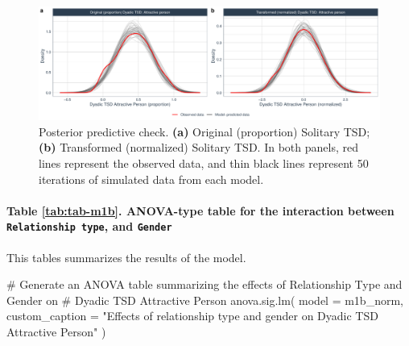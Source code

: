 \documentclass[
  bookmarksnumbered]{article}
\newenvironment{Shaded}{\begin{snugshade}}{\end{snugshade}}
\newcommand{\AttributeTok}[1]{\textcolor[rgb]{0.80,0.80,0.80}{#1}}
\newcommand{\CommentTok}[1]{\textcolor[rgb]{0.50,0.62,0.50}{#1}}
\newcommand{\FunctionTok}[1]{\textcolor[rgb]{0.94,0.94,0.56}{#1}}
\newcommand{\NormalTok}[1]{\textcolor[rgb]{0.80,0.80,0.80}{#1}}
\newcommand{\StringTok}[1]{\textcolor[rgb]{0.80,0.58,0.58}{#1}}
\begin{document}
\begin{figure}
\centering
\includegraphics{Sexual_Desire_Arousal_files/figure-latex/ppc-m1b-1.pdf}
\caption{\label{fig:ppc-m1b}Posterior predictive check. \textbf{(a)} Original (proportion) Solitary TSD; \textbf{(b)} Transformed (normalized) Solitary TSD. In both panels, red lines represent the observed data, and thin black lines represent 50 iterations of simulated data from each model.}
\end{figure}

\paragraph{\texorpdfstring{Table \ref{tab:tab-m1b}. ANOVA-type table for the interaction between \texttt{Relationship\ type}, and \texttt{Gender}}{Table \ref{tab:tab-m1b}. ANOVA-type table for the interaction between Relationship type, and Gender}}\label{table-reftabtab-m1b.-anova-type-table-for-the-interaction-between-relationship-type-and-gender}

This tables summarizes the results of the model.

\begin{Shaded}
\begin{Highlighting}[]
\CommentTok{\# Generate an ANOVA table summarizing the effects of Relationship Type and Gender on}
\CommentTok{\# Dyadic TSD Attractive Person}
\FunctionTok{anova.sig.lm}\NormalTok{(}
  \AttributeTok{model =}\NormalTok{ m1b\_norm,}
  \AttributeTok{custom\_caption =} \StringTok{"Effects of relationship type and gender on Dyadic TSD Attractive Person"}
\NormalTok{)}
\end{Highlighting}
\end{Shaded}
\end{document}
